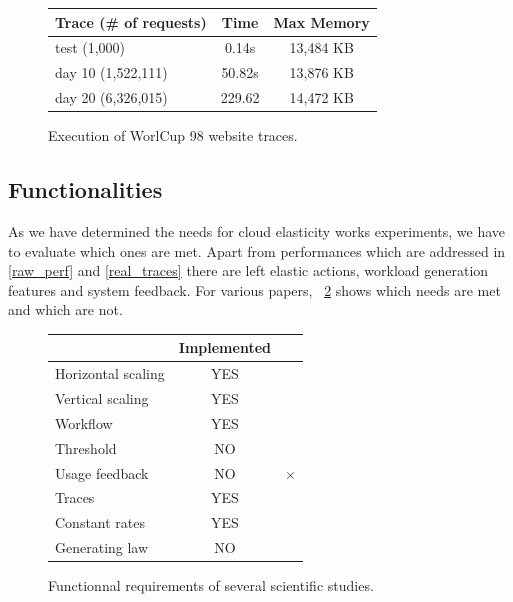 \documentclass[a4paper, onecolumn, 11pt]{article}
\begin{document}
		\begin{figure}
			\centering
	    \begin{center}
	     	\begin{tabular}{| l | c | c |}
	     		\hline
	     		Trace (\# of requests) & Time & Max Memory\\ 
	     		\hline
	     		test (1,000) & 0.14s & 13,484 KB\\
		      \hline
		      day 10 (1,522,111) & 50.82s & 13,876 KB\\
		      \hline
		      day 20 (6,326,015) & 229.62 & 14,472 KB\\
	     		\hline
	     	\end{tabular}
	    \end{center}
	    \caption{Execution of WorlCup 98 website traces.}
	    \label{tab_traces}
	  \end{figure}
  
  \subsection{Functionalities}
	  As we have determined the needs for cloud elasticity works experiments, we
    have to evaluate which ones are met. Apart from performances which are
    addressed in \ref{raw_perf} and \ref{real_traces} there are left elastic
    actions, workload generation features and system feedback. For various
    papers, \figurename~\ref{table_func} shows which needs are met and which are
    not.
  
	  \begin{figure}
	  	\centering
	  	\begin{center}
	  		\begin{tabular}{| l | c | c |}
	  			\hline
	  			& Implemented & \cite{vasic2012dejavu}\\ 
	  			\hline \hline
	  			Horizontal scaling & YES & \checkmark\\
	  			\hline
	  			Vertical scaling & YES & \checkmark\\
	  			\hline
	  			Workflow & YES & \\
	  			\hline
	  			Threshold & NO & \\  %
          \hline \hline
          Usage feedback & NO & $\times$\\
	  			\hline
	  			Traces & YES & \checkmark\\
	  			\hline
	  			Constant rates & YES & \\
	  			\hline
	  			Generating law & NO & \\
	  			\hline
	  		\end{tabular}
	  	\end{center}
	  	\caption{Functionnal requirements of several scientific studies.}
	  	\label{table_func}
	  \end{figure}
\end{document}
